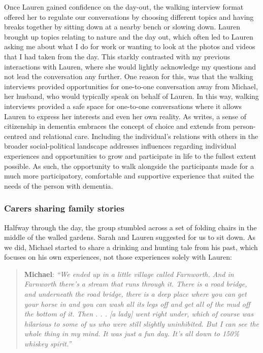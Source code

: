 Once Lauren gained confidence on the day-out, the walking interview format offered her to regulate our conversations by choosing different topics and having breaks together by sitting down at a nearby bench or slowing down. Lauren brought up topics relating to nature and the day out, which often led to Lauren asking me about what I do for work or wanting to look at the photos and videos that I had taken from the day. This starkly contrasted with my previous interactions with Lauren, where she would lightly acknowledge my questions and not lead the conversation any further. One reason for this, was that the walking interviews provided opportunities for one-to-one conversation away from Michael, her husband, who would typically speak on behalf of Lauren. In this way, walking interviews provided a safe space for one-to-one conversations where it allows Lauren to express her interests and even her own reality. As \cite{bartlett_citizenship_2014} writes, a sense of citizenship in dementia embraces the concept of choice and extends from person-centred and relational care. Including the individual's relations with others in the broader social-political landscape addresses influences regarding individual experiences and opportunities to grow and participate in life to the fullest extent possible. As such, the opportunity to walk alongside the participants made for a much more participatory, comfortable and supportive experience that suited the needs of the person with dementia.

\subsubsection{Carers sharing family stories}
Halfway through the day, the group stumbled across a set of folding chairs in the middle of the walled gardens. Sarah and Lauren suggested for us to sit down. As we did, Michael started to share a drinking and hunting tale from his past, which focuses on his own experiences, not those experiences solely with Lauren:

\begin{quote}
\textbf{Michael}:\textit{    ``We ended up in a little village called Farnworth. And in Farnworth there's a stream that runs through it. There is a road bridge, and underneath the road bridge, there is a deep place where you can get your horse in and you can wash all its legs off and get all of the mud off the bottom of it. Then . . . [a lady] went right under, which of course was hilarious to some of us who were still slightly uninhibited. But I can see the whole thing in my mind. It was just a fun day. It's all down to 150\% whiskey spirit.''
}\end{quote}

